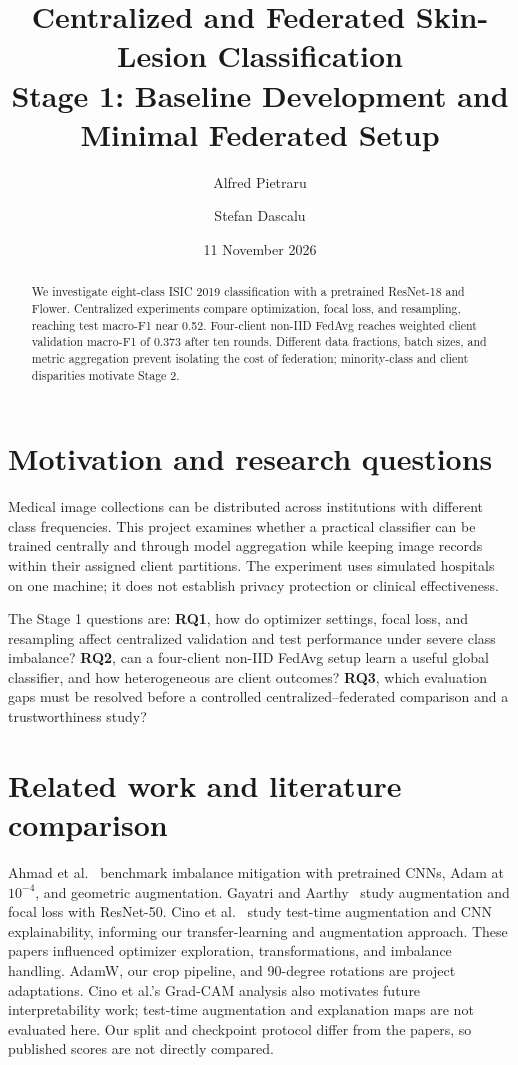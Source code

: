 \documentclass[10pt,a4paper]{article}
\title{Centralized and Federated Skin-Lesion Classification\\\large Stage 1: Baseline Development and Minimal Federated Setup}
\author{Alfred Pietraru \and Stefan Dascalu}
\date{11 November 2026}
\begin{document}
\maketitle
\vspace{-1.5em}
\begin{abstract}
We investigate eight-class ISIC 2019 classification with a pretrained ResNet-18 and Flower. Centralized experiments compare optimization, focal loss, and resampling, reaching test macro-F1 near 0.52. Four-client non-IID FedAvg reaches weighted client validation macro-F1 of 0.373 after ten rounds. Different data fractions, batch sizes, and metric aggregation prevent isolating the cost of federation; minority-class and client disparities motivate Stage 2.
\end{abstract}

\section{Motivation and research questions}
Medical image collections can be distributed across institutions with different class frequencies. This project examines whether a practical classifier can be trained centrally and through model aggregation while keeping image records within their assigned client partitions. The experiment uses simulated hospitals on one machine; it does not establish privacy protection or clinical effectiveness.

The Stage 1 questions are: \textbf{RQ1}, how do optimizer settings, focal loss, and resampling affect centralized validation and test performance under severe class imbalance? \textbf{RQ2}, can a four-client non-IID FedAvg setup learn a useful global classifier, and how heterogeneous are client outcomes? \textbf{RQ3}, which evaluation gaps must be resolved before a controlled centralized--federated comparison and a trustworthiness study?

\section{Related work and literature comparison}
Ahmad et al.~\cite{ahmad2026} benchmark imbalance mitigation with pretrained CNNs, Adam at $10^{-4}$, and geometric augmentation. Gayatri and Aarthy~\cite{gayatri2024} study augmentation and focal loss with ResNet-50. Cino et al.~\cite{cino2025} study test-time augmentation and CNN explainability, informing our transfer-learning and augmentation approach. These papers influenced optimizer exploration, transformations, and imbalance handling. AdamW, our crop pipeline, and 90-degree rotations are project adaptations. Cino et al.'s Grad-CAM analysis also motivates future interpretability work; test-time augmentation and explanation maps are not evaluated here. Our split and checkpoint protocol differ from the papers, so published scores are not directly compared.
\end{document}
